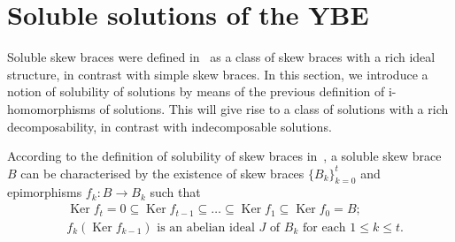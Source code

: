 \documentclass[12pt, a4paper, english]{article}
\theoremstyle{definition}
\newtheorem{exemple}[teorema]{Example}
\theoremstyle{remark}
\DeclareMathOperator{\Ker}{Ker}
\newcommand{\bigcdot}{\boldsymbol{\cdot}}
\begin{document}
%


\section{Soluble solutions of the YBE}
\label{sec:soluble}
Soluble skew braces were defined in~\cite{BallesterEstebanJimenezPerezC24-solubleskewbraces} as a class of skew braces with a rich ideal structure, in contrast with simple skew braces. In this section, we introduce a notion of solubility of solutions by means of the previous definition of i-homomorphisms of solutions. This will give rise to a class of solutions with a rich decomposability, in contrast with indecomposable solutions.



According to the definition of solubility of skew braces in~\cite{BallesterEstebanJimenezPerezC24-solubleskewbraces}, a soluble skew brace $B$ can be characterised by the existence of skew braces $\{B_k\}_{k=0}^t$ and epimorphisms $f_k \colon B \rightarrow B_k$ such that
\begin{align}
& \Ker f_t = 0 \subseteq \Ker f_{t-1} \subseteq \ldots \subseteq \Ker f_1 \subseteq \Ker f_0 = B; \label{eq:cadenaideals}\\
& \text{$f_k(\Ker f_{k-1})$ is an abelian ideal $J$ of $B_{k}$ for each $1\leq k \leq t$.}  \label{eq:abelianideal}
\end{align}
\end{document}
